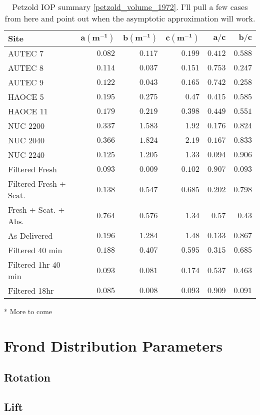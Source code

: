 \begin{table}
  \centering
  \begin{tabular}{lrrrrr}
    \toprule
    \textbf{Site} & $\bm{a (\mbox{m}^{-1})}$ & $\bm{b (\mbox{m}^{-1})}$ & $\bm{c(\mbox{m}^{-1} )}$ & $\bm{a/c}$ & $\bm{b/c}$ \\
    \midrule
    AUTEC 7 & $0.082$ & $0.117$ & $0.199$ & $0.412$ & $0.588$ \\
    AUTEC 8 & $0.114$ & $0.037$ & $0.151$ & $0.753$ & $0.247$ \\
    AUTEC 9 & $0.122$ & $0.043$ & $0.165$ & $0.742$ & $0.258$ \\
    HAOCE 5 & $0.195$ & $0.275$ & $0.47$ & $0.415$ & $0.585$ \\
    HAOCE 11 & $0.179$ & $0.219$ & $0.398$ & $0.449$ & $0.551$ \\
    NUC 2200 & $0.337$ & $1.583$ & $1.92$ & $0.176$ & $0.824$ \\
    NUC 2040 & $0.366$ & $1.824$ & $2.19$ & $0.167$ & $0.833$ \\
    NUC 2240 & $0.125$ & $1.205$ & $1.33$ & $0.094$ & $0.906$ \\
    Filtered Fresh & $0.093$ & $0.009$ & $0.102$ & $0.907$ & $0.093$ \\
    Filtered Fresh + Scat.  & $0.138$ & $0.547$ & $0.685$ & $0.202$ & $0.798$ \\
    Fresh + Scat. + Abs.& $0.764$ & $0.576$ & $1.34$ & $0.57$ & $0.43$ \\
    As Delivered & $0.196$ & $1.284$ & $1.48$ & $0.133$ & $0.867$ \\
    Filtered 40 min & $0.188$ & $0.407$ & $0.595$ & $0.315$ & $0.685$ \\
    Filtered 1hr 40 min & $0.093$ & $0.081$ & $0.174$ & $0.537$ & $0.463$ \\
    Filtered 18hr & $0.085$ & $0.008$ & $0.093$ & $0.909$ & $0.091$ \\
    \bottomrule
    \end{tabular}
  \caption{Petzold IOP summary \ref{petzold_volume_1972}. I'll pull a few cases from here and point out when the asymptotic approximation will work.}
\end{table}

* More to come

\section{Frond Distribution Parameters}
\subsection{Rotation}
\subsection{Lift}
